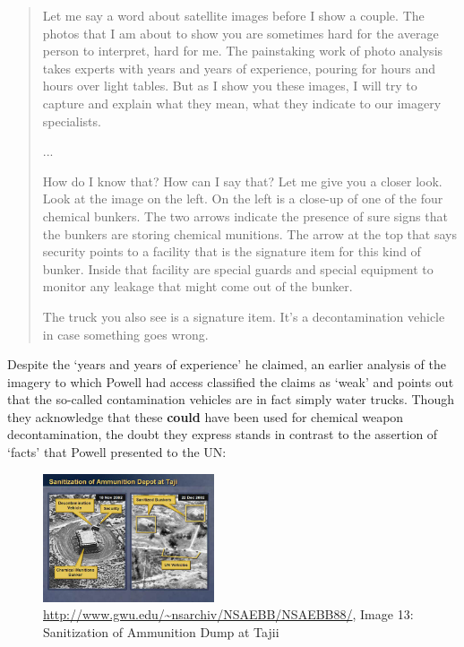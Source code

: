 \documentclass[11pt,oneside,notitlepage]{report}
\begin{document}

\begin{quote}
Let me say a word about satellite images before I show a couple. The photos that I am about to show you are sometimes hard for the average person to interpret, hard for me. The painstaking work of photo analysis takes experts with years and years of experience, pouring for hours and hours over light tables. But as I show you these images, I will try to capture and explain what they mean, what they indicate to our imagery specialists.

...

How do I know that? How can I say that? Let me give you a closer look. Look at the image on the left. On the left is a close-up of one of the four chemical bunkers. The two arrows indicate the presence of sure signs that the bunkers are storing chemical munitions. The arrow at the top that says security points to a facility that is the signature item for this kind of bunker. Inside that facility are special guards and special equipment to monitor any leakage that might come out of the bunker.

The truck you also see is a signature item. It's a decontamination vehicle in case something goes wrong.
\cite{guardian2003powell}
\end{quote}

Despite the `years and years of experience' he claimed, an earlier analysis of the imagery to which Powell had access classified the claims as `weak' and points out that the so-called contamination vehicles are in fact simply water trucks. Though they acknowledge that these \textbf{could} have been used for chemical weapon decontamination, the doubt they express stands in contrast to the assertion of `facts' that Powell presented to the UN: 

\begin{figure}
	\begin{flushright}
		\includegraphics[width=0.45\textwidth]{images/iraq-image-13.jpg}
		\url{http://www.gwu.edu/~nsarchiv/NSAEBB/NSAEBB88/}, Image 13: Sanitization of Ammunition Dump at Tajii	
	\end{flushright}
\end{figure}
\end{document}
